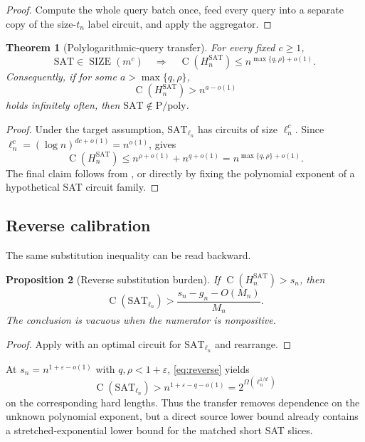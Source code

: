 \documentclass[11pt]{article}
\newtheorem{theorem}{Theorem}[section]
\newtheorem{proposition}[theorem]{Proposition}
\theoremstyle{definition}
\newcommand{\SIZE}{\operatorname{SIZE}}
\newcommand{\Ckt}{\operatorname{C}}
\newcommand{\SAT}{\mathrm{SAT}}
\newcommand{\Ppoly}{\mathrm{P/poly}}
\newcommand{\eps}{\varepsilon}
\begin{document}
\begin{proof}
Compute the whole query batch once, feed every query into a separate copy of the size-$t_n$ label circuit, and apply the aggregator.
\end{proof}

\begin{theorem}[Polylogarithmic-query transfer]\label{thm:beta-zero}
For every fixed $c\ge1$,
\begin{equation}\label{eq:beta-zero}
  \SAT\in\SIZE(m^c)
  \quad\Longrightarrow\quad
  \Ckt(H_n^{\SAT})
  \le n^{\max\{q,\rho\}+o(1)}.
\end{equation}
Consequently, if for some $a>\max\{q,\rho\}$,
\[
  \Ckt(H_n^{\SAT})>n^{a-o(1)}
\]
holds infinitely often, then $\SAT\notin\Ppoly$.
\end{theorem}

\begin{proof}
Under the target assumption, $\SAT_{\ell_n}$ has circuits of size $\ell_n^c$.  Since $\ell_n^c=(\log n)^{dc+o(1)}=n^{o(1)}$,  gives
\[
  \Ckt(H_n^{\SAT})
  \le n^{\rho+o(1)}+n^{q+o(1)}
  =n^{\max\{q,\rho\}+o(1)}.
\]
The final claim follows from , or directly by fixing the polynomial exponent of a hypothetical SAT circuit family.
\end{proof}

\subsection{Reverse calibration}

The same substitution inequality can be read backward.

\begin{proposition}[Reverse substitution burden]\label{prop:reverse}
If $\Ckt(H_n^{\SAT})>s_n$, then
\begin{equation}\label{eq:reverse}
  \Ckt(\SAT_{\ell_n})
  >\frac{s_n-g_n-O(M_n)}{M_n}.
\end{equation}
The conclusion is vacuous when the numerator is nonpositive.
\end{proposition}

\begin{proof}
Apply  with an optimal circuit for $\SAT_{\ell_n}$ and rearrange.
\end{proof}

At $s_n=n^{1+\eps-o(1)}$ with $q,\rho<1+\eps$, \eqref{eq:reverse} yields
\[
  \Ckt(\SAT_{\ell_n})
  >n^{1+\eps-q-o(1)}
  =2^{\Omega(\ell_n^{1/d})}
\]
on the corresponding hard lengths.  Thus the transfer removes dependence on the unknown polynomial exponent, but a direct source lower bound already contains a stretched-exponential lower bound for the matched short SAT slices.
\end{document}
